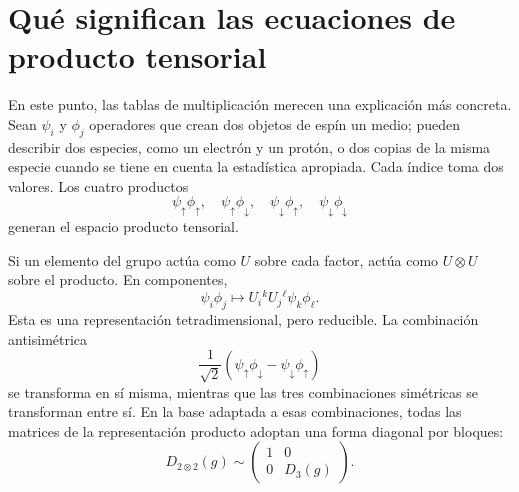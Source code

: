\begin{classroomqa}
\end{classroomqa}

\section{Qué significan las ecuaciones de producto tensorial}

En este punto, las tablas de multiplicación merecen una explicación más concreta. Sean \(\psi_i\) y \(\phi_j\) operadores que crean dos objetos de espín un medio; pueden describir dos especies, como un electrón y un protón, o dos copias de la misma especie cuando se tiene en cuenta la estadística apropiada. Cada índice toma dos valores. Los cuatro productos
\begin{equation}
\psi_\uparrow\phi_\uparrow,
\quad
\psi_\uparrow\phi_\downarrow,
\quad
\psi_\downarrow\phi_\uparrow,
\quad
\psi_\downarrow\phi_\downarrow
\end{equation}
generan el espacio producto tensorial.

Si un elemento del grupo actúa como \(U\) sobre cada factor, actúa como \(U\otimes U\) sobre el producto. En componentes,
\begin{equation}
\psi_i\phi_j
\longmapsto
U_i{}^kU_j{}^\ell\psi_k\phi_\ell.
\label{eq:l4-product-action}
\end{equation}
Esta es una representación tetradimensional, pero reducible. La combinación antisimétrica
\begin{equation}
\frac{1}{\sqrt2}
(\psi_\uparrow\phi_\downarrow
-\psi_\downarrow\phi_\uparrow)
\end{equation}
se transforma en sí misma, mientras que las tres combinaciones simétricas se transforman entre sí. En la base adaptada a esas combinaciones, todas las matrices de la representación producto adoptan una forma diagonal por bloques:
\begin{equation}
D_{2\otimes2}(g)
\sim
\begin{pmatrix}
1&0\\
0&D_3(g)
\end{pmatrix}.
\label{eq:l4-spin-block-diagonal}
\end{equation}

